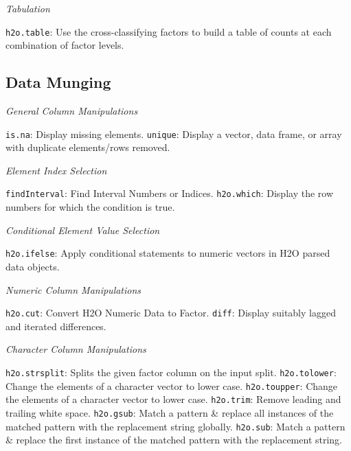 {{\emph{Tabulation}\par
{\texttt{h2o.table}}: Use the cross-classifying factors to build a table of counts at each combination of factor levels.

\subsection{Data Munging}\par

\emph{General Column Manipulations}\par
{\texttt{is.na}}: Display missing elements.  \newline
{\texttt{unique}}: Display a vector, data frame, or array with duplicate elements/rows removed.\newline%

\emph{Element Index Selection}\par 
{\texttt{findInterval}}: Find Interval Numbers or Indices.\newline%
{\texttt{h2o.which}}: Display the row numbers for which the condition is true.\newline

\emph{Conditional Element Value Selection}\par 
{\texttt{h2o.ifelse}}: Apply conditional statements to numeric vectors in H2O parsed data objects.\newline

\emph{Numeric Column Manipulations}\par
{\texttt{h2o.cut}}: Convert H2O Numeric Data to Factor. \newline
{\texttt{diff}}: Display suitably lagged and iterated differences.\newline%

\emph{Character Column Manipulations}\par
{\texttt{h2o.strsplit}}: Splits the given factor column on the input split. \newline
{\texttt{h2o.tolower}}: Change the elements of a character vector to lower case. \newline
{\texttt{h2o.toupper}}: Change the elements of a character vector to lower case. \newline
{\texttt{h2o.trim}}: Remove leading and trailing white space.\newline
{\texttt{h2o.gsub}}: Match a pattern \& replace all instances of the matched pattern with the replacement string globally. \newline
{\texttt{h2o.sub}}: Match a pattern \& replace the first instance of the matched pattern with the replacement string.\newline

}}

